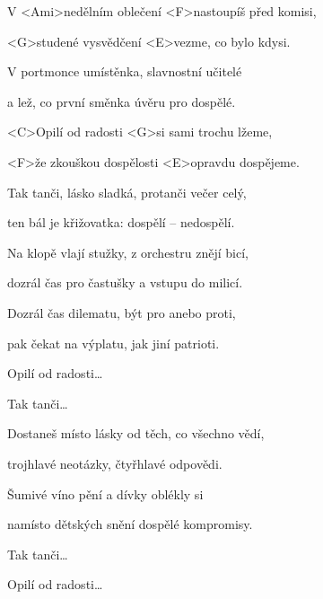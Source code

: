

\zs
V <Ami>nedělním oblečení <F>nastoupíš před komisi,

<G>studené vysvědčení <E>vezme, co bylo kdysi.
\ks

\zs
V portmonce umístěnka, slavnostní učitelé

a lež, co první směnka úvěru pro dospělé.
\ks

\zr
<C>Opilí od radosti <G>si sami trochu lžeme,

<F>že zkouškou dospělosti <E>opravdu dospějeme.
\kr

\zr
Tak tanči, lásko sladká, protanči večer celý,

ten bál je křižovatka: dospělí – nedospělí.
\kr

\zs
Na klopě vlají stužky, z orchestru znějí bicí,

dozrál čas pro častušky a vstupu do milicí.
\ks

\zs
Dozrál čas dilematu, být pro anebo proti,

pak čekat na výplatu, jak jiní patrioti.
\ks

\zr
Opilí od radosti…
\kr

\zr
Tak tanči…
\kr

\zs
Dostaneš místo lásky od těch, co všechno vědí,

trojhlavé neotázky, čtyřhlavé odpovědi.
\ks

\hvezda
Šumivé víno pění a dívky oblékly si

namísto dětských snění dospělé kompromisy.
\kr

\zr
Tak tanči…
\kr

\zr
Opilí od radosti…
\kr

\kp
